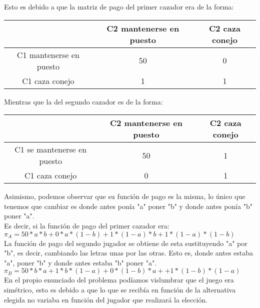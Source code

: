 \documentclass[10pt,a4paper]{book}
\begin{document}
Esto es debido a que la matriz de pago del primer cazador era de la forma:\\

\begin{center}
	\begin{tabular}{|c|c|c|}
		\hline
		 & C2 mantenerse en puesto & C2 caza conejo \\
		\hline
		C1 mantenerse en puesto & 50 & 0 \\
		\hline
		C1 caza conejo & 1 & 1 \\
		\hline
	\end{tabular}
\end{center}

Mientras que la del segundo cazador es de la forma:\\



\begin{center}
	\begin{tabular}{|c|c|c|}
		\hline
		  & C2 mantenerse en puesto & C2 caza conejo  \\
		\hline
		C1 se mantenerse en puesto & 50 & 1 \\
		\hline
		C1 caza conejo & 0 & 1 \\
		\hline
	\end{tabular}
\end{center}

Asimismo, podemos observar que su función de pago es la misma, lo único que tenemos que cambiar es donde antes ponía "a" poner "b" y donde antes ponía "b" poner "a".\\

Es decir, si la función de pago del primer cazador era: \\
$ \pi_A= 50*a*b + 0*a*(1-b) + 1*(1-a)*b + 1*(1-a)*(1-b)$ \\

La función de pago del segundo jugador se obtiene de esta sustituyendo "a" por "b", es decir, cambiando las letras unas por las otras. Esto es, donde antes estaba "a", poner "b" y donde antes estaba "b" poner "a".\\

$ \pi_B= 50*b*a + 1*b*(1-a)+ 0*(1-b)*a +  + 1*(1-b)*(1-a)$ \\

En el propio enunciado del problema podíamos vislumbrar que el juego era simétrico, esto es debido a que lo que se recibía en función de la alternativa elegida no variaba en función del jugador que realizará la elección.\\
\end{document}
